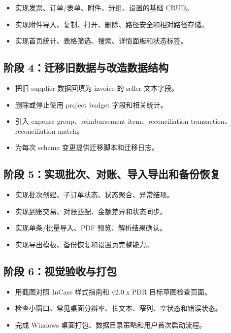 \documentclass[UTF8,zihao=-4]{ctexart}
\begin{document}
\begin{itemize}
  \item 实现发票、订单/表单、附件、分组、设置的基础 CRUD。
  \item 实现附件导入、复制、打开、删除、路径安全和相对路径存储。
  \item 实现首页统计、表格筛选、搜索、详情面板和状态标签。
\end{itemize}

\subsection{阶段 4：迁移旧数据与改造数据结构}

\begin{itemize}
  \item 把旧 supplier 数据回填为 invoice 的 seller 文本字段。
  \item 删除或停止使用 project budget 字段和相关统计。
  \item 引入 expense group、reimbursement item、reconciliation transaction、reconciliation match。
  \item 为每次 schema 变更提供迁移脚本和迁移日志。
\end{itemize}

\subsection{阶段 5：实现批次、对账、导入导出和备份恢复}

\begin{itemize}
  \item 实现批次创建、子订单状态、状态聚合、异常结项。
  \item 实现到账交易、对账匹配、金额差异和状态同步。
  \item 实现单条/批量导入、PDF 预览、解析结果确认。
  \item 实现导出模板、备份恢复和设置页完整能力。
\end{itemize}

\subsection{阶段 6：视觉验收与打包}

\begin{itemize}
  \item 用截图对照 InCase 样式指南和 v2.0.x PDR 目标草图检查页面。
  \item 检查小窗口、常见桌面分辨率、长文本、窄列、空状态和错误状态。
  \item 完成 Windows 桌面打包、数据目录策略和用户首次启动流程。
\end{itemize}
\end{document}

